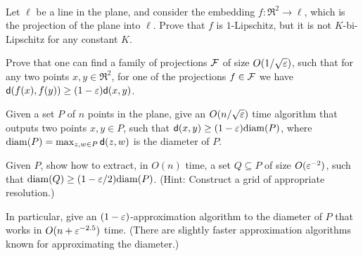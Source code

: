 
\begin{exercise}~
    \begin{compactenuma}
        \item {} Let $\ell$ be a line in the plane, and
        consider the embedding $f:\Re^2 \rightarrow \ell$, which is
        the projection of the plane into $\ell$.  Prove that $f$ is
        $1$-Lipschitz, but it is not $K$-bi-Lipschitz for any constant
        $K$.
        
        \item {} Prove that one can find a family of
        projections $\mathcal{F}$ of size $O(1/\sqrt{{\varepsilon}})$, such that for any
        two points $x,y \in \Re^2$, for one of the projections $f \in
        \mathcal{F}$ we have $\mathsf{d}(f(x), f(y)) \geq (1-{\varepsilon})\mathsf{d}(x,y)$.
        
        \item {} Given a set $P$ of $n$ points in the plane, give
        an $O(n/\sqrt{{\varepsilon}})$ time algorithm that outputs two points
        $x,y \in P$, such that $\mathsf{d}(x,y) \geq (1-{\varepsilon})\mathrm{diam}(P)$,
        where $\mathrm{diam}(P) = \max_{z,w\in P} \mathsf{d}(z,w)$ is the
        diameter of $P$.
        
        \item {} Given $P$, show how to extract, in $O(n)$
        time, a set $Q\subseteq P$ of size $O({\varepsilon}^{-2})$, such that
        $\mathrm{diam}(Q)\geq (1-{\varepsilon}/2)\mathrm{diam}(P)$. (Hint: Construct a grid of
        appropriate resolution.)
        
        In particular, give an $(1-{\varepsilon})$-approximation algorithm to
        the diameter of $P$ that works in $O(n + {\varepsilon}^{-2.5})$ time.
        (There are slightly faster approximation algorithms known for
        approximating the diameter.)
    \end{compactenuma}
\end{exercise}



